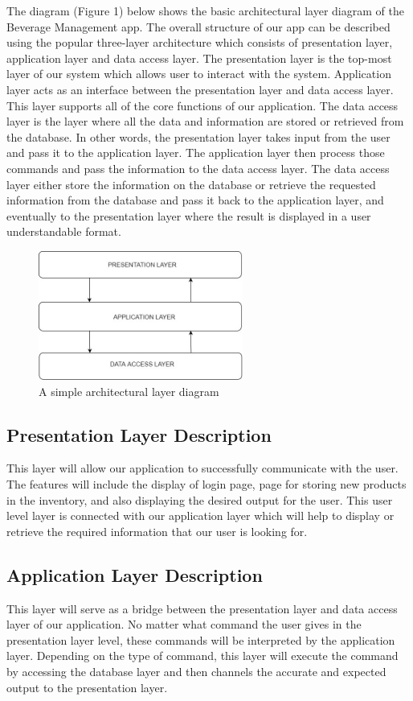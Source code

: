 The diagram (Figure 1) below shows the basic architectural layer diagram of the Beverage Management app. The overall structure of our app can be described using the popular three-layer architecture which consists of presentation layer, application layer and data access layer. The presentation layer is the top-most layer of our system which allows user to interact with the system. Application layer acts as an interface between the presentation layer and data access layer. This layer supports all of the core functions of our application. The data access layer is the layer where all the data and information are stored or retrieved from the database. In other words, the presentation layer takes input from the user and pass it to the application layer. The application layer then process those commands and pass the information to the data access layer. The data access layer either store the information on the database or retrieve the requested information from the database and pass it back to the application layer, and eventually to the presentation layer where the result is displayed in a user understandable format. 

\begin{figure}[h!]
	\centering
 	\includegraphics[width=0.60\textwidth]{images/ADS}
 \caption{A simple architectural layer diagram}
\end{figure}

\subsection{Presentation Layer Description}
This layer will allow our application to successfully communicate with the user. The features will include the display of login page, page for storing new products in the inventory, and also displaying the desired output for the user. This user level layer is connected with our application layer which will help to display or retrieve the required information that our user is looking for.

\subsection{Application Layer Description}
This layer will serve as a bridge between the presentation layer and data access layer of our application.  No matter what command the user gives in the presentation layer level, these commands will be interpreted by the application layer. Depending on the type of command, this layer will execute the command by accessing the database layer and then channels the accurate and expected output to the presentation layer.

